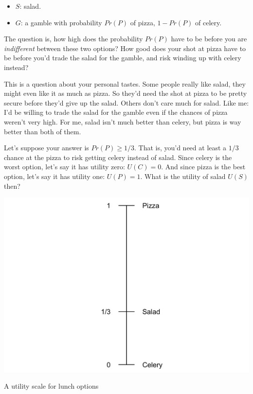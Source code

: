 \documentclass[justified]{tufte-book}
\providecommand{\tightlist}{%
  \setlength{\itemsep}{0pt}\setlength{\parskip}{0pt}}
\renewcommand{\u}{U}
\newcommand{\p}{Pr}
\theoremstyle{definition}
\theoremstyle{definition}
\theoremstyle{definition}
\theoremstyle{definition}
\theoremstyle{remark}
\begin{document}
\begin{itemize}
\tightlist
\item
  \(S\): salad.
\item
  \(G\): a gamble with probability \(\p(P)\) of pizza, \(1-\p(P)\) of celery.
\end{itemize}

The question is, how high does the probability \(\p(P)\) have to be before you are \emph{indifferent} between these two options? How good does your shot at pizza have to be before you'd trade the salad for the gamble, and risk winding up with celery instead?

This is a question about your personal tastes. Some people really like salad, they might even like it as much as pizza. So they'd need the shot at pizza to be pretty secure before they'd give up the salad. Others don't care much for salad. Like me: I'd be willing to trade the salad for the gamble even if the chances of pizza weren't very high. For me, salad isn't much better than celery, but pizza is way better than both of them.

Let's suppose your answer is \(\p(P) \geq 1/3\). That is, you'd need at least a \(1/3\) chance at the pizza to risk getting celery instead of salad. Since celery is the worst option, let's say it has utility zero: \(\u(C)=0\). And since pizza is the best option, let's say it has utility one: \(\u(P)=1\). What is the utility of salad \(\u(S)\) then?

\begin{marginfigure}
\includegraphics{_main_files/figure-latex/unnamed-chunk-104-1} \caption[A utility scale for lunch options]{A utility scale for lunch options}\label{fig:unnamed-chunk-104}
\end{marginfigure}
\end{document}

